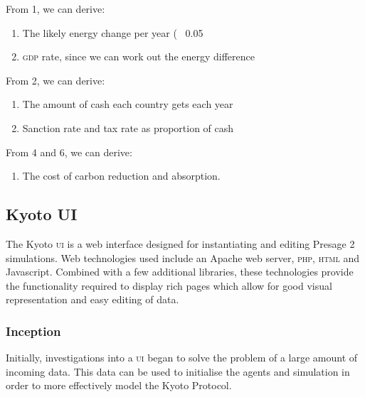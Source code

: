 From 1, we can derive: 

\begin{enumerate}[resume]
\item The likely energy change per year (~ 0.05%
\item \textsc{gdp} rate, since we can work out the energy difference
\end{enumerate}

From 2, we can derive:

\begin{enumerate}[resume]
\item The amount of cash each country gets each year
\item Sanction rate and tax rate as proportion of cash
\end{enumerate}

From 4 and 6, we can derive:

\begin{enumerate}[resume]
\item The cost of carbon reduction and absorption.
\end{enumerate}

\subsection{Kyoto UI}

The Kyoto \textsc{ui} is a web interface designed for instantiating and editing Presage 2 simulations. Web technologies used include an Apache web server, \textsc{php}, \textsc{html} and Javascript. Combined with a few additional libraries, these technologies provide the functionality required to display rich pages which allow for good visual representation and easy editing of data.

\subsubsection{Inception}

Initially, investigations into a \textsc{ui} began to solve the problem of a large amount of incoming data. This data can be used to initialise the agents and simulation in order to more effectively model the Kyoto Protocol.

